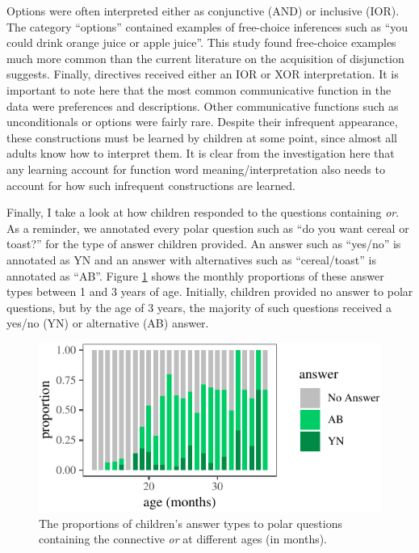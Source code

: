 \documentclass[floatsintext,man]{apa6}
\theoremstyle{definition}
\theoremstyle{definition}
\theoremstyle{definition}
\theoremstyle{remark}
\begin{document}
Options were often interpreted either as conjunctive (AND) or inclusive
(IOR). The category \enquote{options} contained examples of free-choice
inferences such as \enquote{you could drink orange juice or apple
juice}. This study found free-choice examples much more common than the
current literature on the acquisition of disjunction suggests. Finally,
directives received either an IOR or XOR interpretation. It is important
to note here that the most common communicative function in the data
were preferences and descriptions. Other communicative functions such as
unconditionals or options were fairly rare. Despite their infrequent
appearance, these constructions must be learned by children at some
point, since almost all adults know how to interpret them. It is clear
from the investigation here that any learning account for function word
meaning/interpretation also needs to account for how such infrequent
constructions are learned.

Finally, I take a look at how children responded to the questions
containing \emph{or}. As a reminder, we annotated every polar question
such as \enquote{do you want cereal or toast?} for the type of answer
children provided. An answer such as \enquote{yes/no} is annotated as YN
and an answer with alternatives such as \enquote{cereal/toast} is
annotated as \enquote{AB}. Figure \ref{fig:answerPlot} shows the monthly
proportions of these answer types between 1 and 3 years of age.
Initially, children provided no answer to polar questions, but by the
age of 3 years, the majority of such questions received a yes/no (YN) or
alternative (AB) answer.

\begin{figure}[tb]

{\centering \includegraphics{figs/answerPlot-1} 

}

\caption{The proportions of children's answer types to polar questions containing the connective \textit{or} at different ages (in months).}\label{fig:answerPlot}
\end{figure}
\end{document}
